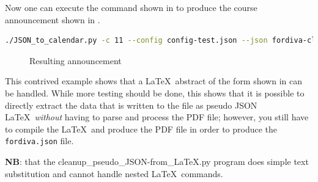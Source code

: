 Now one can execute the command shown in  to produce the course announcement shown in .
\begin{lstlisting}[language={bash}, caption={}, label=lst:resultingAnniouncement]
./JSON_to_calendar.py -c 11 --config config-test.json --json fordiva-cleaned.json --nocortina
\end{lstlisting}

\begin{figure}[!ht]
  \begin{center}
  \end{center}
  \caption{Resulting announcement}
  \label{fig:resultingAnnouncementPNG}
\end{figure}
\FloatBarrier


This contrived example shows that a \LaTeX~abstract of the form shown in  can be handled. While more testing should be done, this shows that it is possible to directly extract the data that is written to the file as pseudo JSON \LaTeX~\textit{without} having to parse and process the PDF file; however, you still have to compile the \LaTeX~and produce the PDF file in order to produce the \texttt{fordiva.json} file.

\textbf{NB}: that the cleanup\_pseudo\_JSON-from\_LaTeX.py program does simple text substitution and cannot handle nested \LaTeX~commands.

